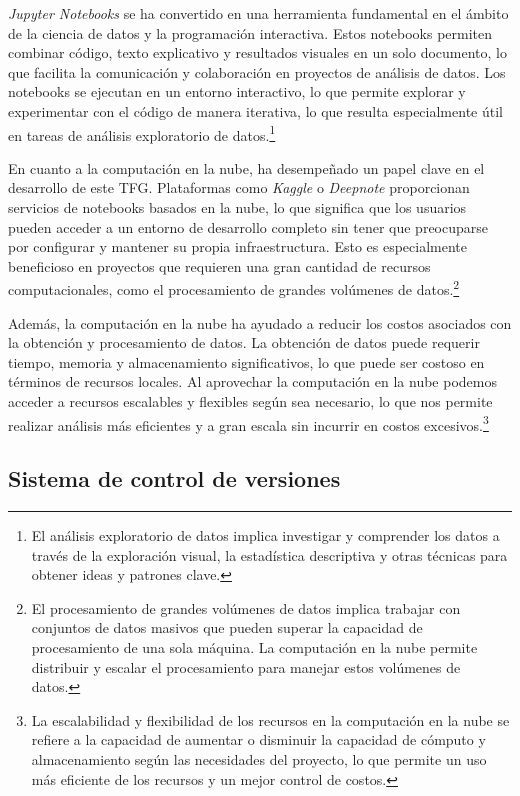 \textit{Jupyter Notebooks} se ha convertido en una herramienta fundamental en el ámbito de la ciencia de datos y 
la programación interactiva. Estos notebooks permiten combinar código, texto explicativo y resultados 
visuales en un solo documento, lo que facilita la comunicación y colaboración en proyectos de análisis 
de datos. Los notebooks se ejecutan en un entorno interactivo, lo que permite explorar y experimentar 
con el código de manera iterativa, lo que resulta especialmente útil en tareas de análisis exploratorio 
de datos.\footnote{El análisis exploratorio de datos implica investigar y comprender los datos a través 
de la exploración visual, la estadística descriptiva y otras técnicas para obtener ideas y patrones 
clave.}

En cuanto a la computación en la nube, ha desempeñado un papel clave en el desarrollo de este TFG.
Plataformas como \textit{Kaggle} o \textit{Deepnote} proporcionan servicios de notebooks basados en la nube, lo que 
significa que los usuarios pueden acceder a un entorno de desarrollo completo sin tener que preocuparse 
por configurar y mantener su propia infraestructura. Esto es especialmente beneficioso en proyectos 
que requieren una gran cantidad de recursos computacionales, como el procesamiento de grandes volúmenes
 de datos.\footnote{El procesamiento de grandes volúmenes de datos implica trabajar con conjuntos de 
 datos masivos que pueden superar la capacidad de procesamiento de una sola máquina. La computación 
 en la nube permite distribuir y escalar el procesamiento para manejar estos volúmenes de datos.}

Además, la computación en la nube ha ayudado a reducir los costos asociados con la obtención y 
procesamiento de datos. La obtención de datos puede requerir tiempo, memoria y almacenamiento 
significativos, lo que puede ser costoso en términos de recursos locales. Al aprovechar la computación 
en la nube podemos acceder a recursos escalables y flexibles según 
sea necesario, lo que nos permite realizar análisis más eficientes y a gran escala sin incurrir en 
costos excesivos.\footnote{La escalabilidad y flexibilidad de los recursos en la computación en la 
nube se refiere a la capacidad de aumentar o disminuir la capacidad de cómputo y almacenamiento 
según las necesidades del proyecto, lo que permite un uso más eficiente de los recursos y un mejor 
control de costos.}

\subsection{Sistema de control de versiones}

